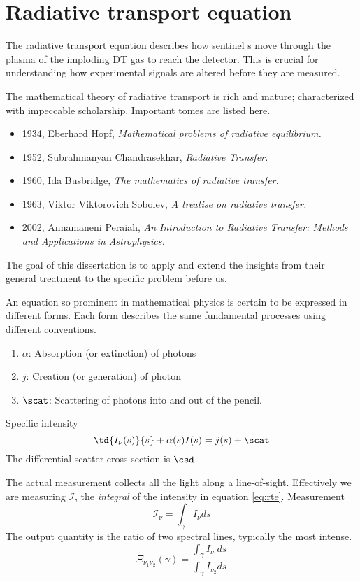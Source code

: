 \chapter{\label{ch:rte}Radiative transport equation}

The radiative transport equation describes how sentinel \xr s move through the plasma of the imploding DT gas to reach the detector. This is crucial for understanding how experimental signals are altered before they are measured.

The mathematical theory of radiative transport is rich and mature; characterized with impeccable scholarship. Important tomes are listed here.
\begin{itemize}
\item 1934, Eberhard Hopf, \emph{Mathematical problems of radiative equilibrium.}\cite{hopf1934}
\item 1952, Subrahmanyan Chandrasekhar, \emph{Radiative Transfer.}\cite{chandra1960}
\item 1960, Ida Busbridge, \emph{The mathematics of radiative transfer.}\cite{Busbridge1960}
\item 1963, Viktor Viktorovich Sobolev, \emph{A treatise on radiative transfer.}\cite{sobolev1963}
\item 2002, Annamaneni Peraiah, \emph{An Introduction to Radiative Transfer: Methods and Applications in Astrophysics.}\cite{Peraiah2002}
\end{itemize}
The goal of this dissertation is to apply and extend the insights from their general treatment to the specific problem before us. 

An equation so prominent in mathematical physics is certain to be expressed in different forms. Each form describes the same fundamental processes using different conventions.
\begin{enumerate}
\item $\alpha$: Absorption (or extinction) of photons
\item $j$: Creation (or generation) of photon
\item $\scat$: Scattering of photons into and out of the pencil.
\end{enumerate}
Specific intensity
\begin{equation}
  \td{I_{\nu}(s)}{s} + \alpha(s) I(s) = j(s) + \scat
  \label{eq:rte}
\end{equation}
The differential scatter cross section is $\csd$.

The actual measurement collects all the light along a line-of-sight. Effectively we are measuring $\mathcal{I}$, the \emph{integral} of the intensity in equation \eqref{eq:rte}. 
Measurement
\begin{equation}
  \mathcal{I_{\nu}} = \int_{\gamma} I_{\nu} ds
  \label{eq:i:measured}
\end{equation}
The output quantity is the ratio of two spectral lines, typically the most intense.
\begin{equation}
  \boxed{
  \Xi_{\nu_{1}\nu_{2}}(\gamma) = \frac{\int_{\gamma} I_{\nu_{1}}ds} {\int_{\gamma} I_{\nu_{2}}ds}
  }
  \label{eq:xi}
\end{equation}

